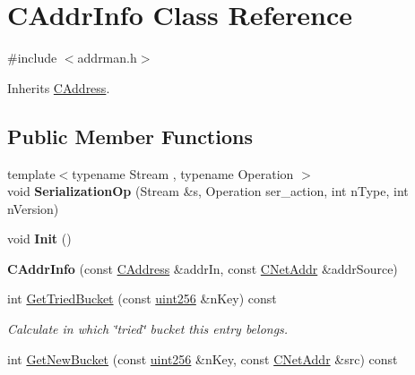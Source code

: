 \hypertarget{class_c_addr_info}{}\section{C\+Addr\+Info Class Reference}
\label{class_c_addr_info}


{\ttfamily \#include $<$addrman.\+h$>$}



Inherits \mbox{\hyperlink{class_c_address}{C\+Address}}.

\subsection*{Public Member Functions}
\begin{DoxyCompactItemize}
\item 
\mbox{\label{class_c_addr_info_ae80fdec7d3b48278033ea2280f66e68b}} 
{\footnotesize template$<$typename Stream , typename Operation $>$ }\\void {\bfseries Serialization\+Op} (Stream \&s, Operation ser\+\_\+action, int n\+Type, int n\+Version)
\item 
\mbox{\label{class_c_addr_info_af1df1f12bc71ed7f3debae61058b9b9f}} 
void {\bfseries Init} ()
\item 
\mbox{\label{class_c_addr_info_a27e773233e8d7e7d183f138d24cc40ef}} 
{\bfseries C\+Addr\+Info} (const \mbox{\hyperlink{class_c_address}{C\+Address}} \&addr\+In, const \mbox{\hyperlink{class_c_net_addr}{C\+Net\+Addr}} \&addr\+Source)
\item 
\mbox{\label{class_c_addr_info_a11e2712f11c0d92c75976e90f2c5003e}} 
int \mbox{\hyperlink{class_c_addr_info_a11e2712f11c0d92c75976e90f2c5003e}{Get\+Tried\+Bucket}} (const \mbox{\hyperlink{classuint256}{uint256}} \&n\+Key) const
\begin{DoxyCompactList}\small\item\em Calculate in which \char`\"{}tried\char`\"{} bucket this entry belongs. \end{DoxyCompactList}\item 
\mbox{\label{class_c_addr_info_ae4459cd7719834bbcf77874757c6875e}} 
int \mbox{\hyperlink{class_c_addr_info_ae4459cd7719834bbcf77874757c6875e}{Get\+New\+Bucket}} (const \mbox{\hyperlink{classuint256}{uint256}} \&n\+Key, const \mbox{\hyperlink{class_c_net_addr}{C\+Net\+Addr}} \&src) const

\end{DoxyCompactItemize}
